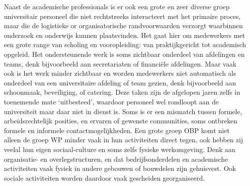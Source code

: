 \documentclass{jote-book}
\begin{document}
	Naast de academische professionals is er ook een grote en zeer diverse groep universitair personeel die niet rechtstreeks interacteert met het primaire proces, maar die de logistieke or organisatorische randvoorwaarden verzorgt waarbinnen onderzoek en onderwijs kunnen plaatsvinden. Het gaat hier om medewerkers met een grote range van scholing en vooropleiding: van praktijkgericht tot academisch opgeleid. Het ondersteunende werk is soms zichtbaar onderdeel van afdelingen en teams, denk bijvoorbeeld aan secretariaten of financiële afdelingen. Maar vaak ook is het werk minder zichtbaar en worden medewerkers niet automatisch als onderdeel van een universitaire afdeling of team gezien, denk bijvoorbeeld aan schoonmaak, beveiliging, of catering. Deze taken zijn de afgelopen jaren zelfs in toenemende mate ‘uitbesteed', waardoor personeel wel rondloopt aan de universiteit maar daar niet in dienst is. Soms is er een mismatch tussen formele, arbeidsrechtelijk posities, en ervaren of gewenste communities, soms ontbreken formele en informele contactmogelijkheden. Een grote groep OBP komt niet alleen de groep WP minder vaak in hun activiteiten direct tegen, ook hebben zij veelal hun eigen sociaal-culture en soms zelfs fysieke werkomgeving. Denk aan organisatie- en overlegstructuren, en dat bedrijfsonderdelen en academische activiteiten vaak fysiek in andere gebouwen of bouwdelen zijn gehuisvest. Ook sociale activiteiten worden daardoor vaak gescheiden georganiseerd.
\end{document}
